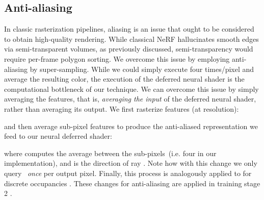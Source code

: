 \subsection{Anti-aliasing}
\label{sec:antialiasing}
In classic rasterization pipelines, aliasing is an issue that ought to be considered to obtain high-quality rendering.
While classical NeRF hallucinates smooth edges via semi-transparent volumes, as previously discussed, semi-transparency would require per-frame polygon sorting. 
We overcome this issue by employing anti-aliasing by super-sampling.
While we could simply execute  four times/pixel and average the resulting color, the execution of the deferred neural shader  is the computational bottleneck of our technique.
We can overcome this issue by simply averaging the features, that is, \textit{averaging the input} of the deferred neural shader, rather than averaging its output.
We first rasterize features (at  resolution):

and then average sub-pixel features to produce the anti-aliased representation we feed to our neural deferred shader:

where  computes the average between the sub-pixels~(i.e. four in our implementation), and  is the direction of ray .
Note how with this change we only query~ \textit{once} per output pixel. Finally, this process is analogously applied to  for discrete occupancies .
These changes for anti-aliasing are applied in training stage 2 .


